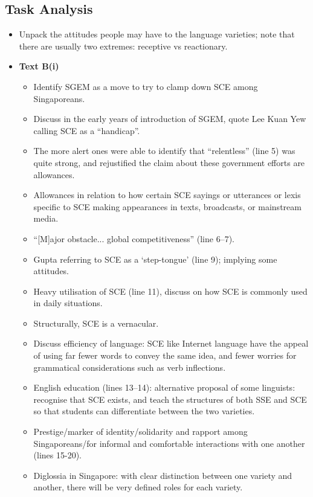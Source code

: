 \documentclass[../main.tex]{subfiles}
\begin{document}
        \subsection*{Task Analysis}
        \begin{itemize}
            \item Unpack the attitudes people may have to the language varieties; note that there are usually two extremes: receptive vs reactionary.
            \item \textbf{Text B(i)} \begin{itemize}
                \item Identify SGEM as a move to try to clamp down SCE among Singaporeans.
                \item Discuss in the early years of introduction of SGEM, quote Lee Kuan Yew calling SCE as a ``handicap''.
                \item The more alert ones were able to identify that ``relentless'' (line 5) was quite strong, and rejustified the claim about these government efforts are allowances.
                \item Allowances in relation to how certain SCE sayings or utterances or lexis specific to SCE making appearances in texts, broadcasts, or mainstream media.
                \item ``[M]ajor obstacle... global competitiveness'' (line 6--7).
                \item Gupta referring to SCE as a `step-tongue' (line 9); implying some attitudes.
                \item Heavy utilisation of SCE (line 11), discuss on how SCE is commonly used in daily situations.
                \item Structurally, SCE is a vernacular.
                \item Discuss efficiency of language: SCE like Internet language have the appeal of using far fewer words to convey the same idea, and fewer worries for grammatical considerations such as verb inflections. 
                \item English education (lines 13--14): alternative proposal of some linguists: recognise that SCE exists, and teach the structures of both SSE and SCE so that students can differentiate between the two varieties. 
                \item Prestige/marker of identity/solidarity and rapport among Singaporeans/for informal and comfortable interactions with one another (lines 15-20).
                \item Diglossia in Singapore: with clear distinction between one variety and another, there will be very defined roles for each variety.

\end{itemize}
\end{itemize}
\end{document}
